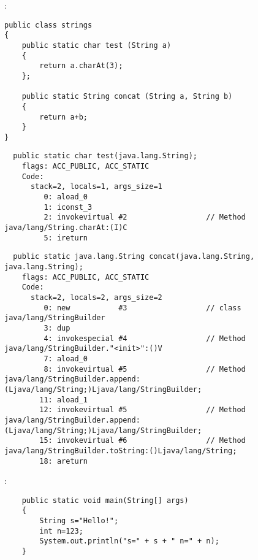 
:

\begin{lstlisting}
public class strings
{
	public static char test (String a)
	{
		return a.charAt(3);
	};

	public static String concat (String a, String b)
	{
		return a+b;
	}
}
\end{lstlisting}

\begin{lstlisting}
  public static char test(java.lang.String);
    flags: ACC_PUBLIC, ACC_STATIC
    Code:
      stack=2, locals=1, args_size=1
         0: aload_0       
         1: iconst_3      
         2: invokevirtual #2                  // Method java/lang/String.charAt:(I)C
         5: ireturn       
\end{lstlisting}
         

\begin{lstlisting}
  public static java.lang.String concat(java.lang.String, java.lang.String);
    flags: ACC_PUBLIC, ACC_STATIC
    Code:
      stack=2, locals=2, args_size=2
         0: new           #3                  // class java/lang/StringBuilder
         3: dup           
         4: invokespecial #4                  // Method java/lang/StringBuilder."<init>":()V
         7: aload_0       
         8: invokevirtual #5                  // Method java/lang/StringBuilder.append:(Ljava/lang/String;)Ljava/lang/StringBuilder;
        11: aload_1       
        12: invokevirtual #5                  // Method java/lang/StringBuilder.append:(Ljava/lang/String;)Ljava/lang/StringBuilder;
        15: invokevirtual #6                  // Method java/lang/StringBuilder.toString:()Ljava/lang/String;
        18: areturn       
\end{lstlisting}

:

\begin{lstlisting}
	public static void main(String[] args)
	{
		String s="Hello!";
		int n=123;
		System.out.println("s=" + s + " n=" + n);
	}
\end{lstlisting}


